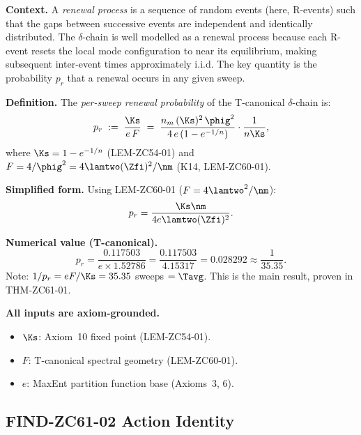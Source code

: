 \documentclass[12pt, a4paper]{article}
\begin{document}
\begin{formalbox}[title={DEF-ZC61-01: Renewal Probability
  $p_r = \Ks/(eF)$ ($R_0$)}]

\textbf{Context.}
A \emph{renewal process} is a sequence of random events
(here, R-events) such that the gaps between successive events
are independent and identically distributed.
The $\delta$-chain is well modelled as a renewal process
because each R-event resets the local mode configuration
to near its equilibrium, making subsequent inter-event
times approximately i.i.d.
The key quantity is the probability $p_r$ that a renewal
occurs in any given sweep.

\medskip
\textbf{Definition.}
The \emph{per-sweep renewal probability} of the T-canonical
$\delta$-chain is:
\begin{equation}
  p_r \;:=\; \frac{\Ks}{e\,F}
  \;=\; \frac{n_m\,(\Ks)^2\,\phig^2}{4\,e\,(1-e^{-1/n})}
  \cdot \frac{1}{n\Ks},
  \label{eq:pr}
\end{equation}
where $\Ks = 1-e^{-1/n}$ (LEM-ZC54-01) and
$F = 4/\phig^2 = 4\lamtwo(\Zfi)^2/\nm$ (K14, LEM-ZC60-01).

\textbf{Simplified form.}
Using LEM-ZC60-01 ($F = 4\lamtwo^2/\nm$):
\[
  p_r = \frac{\Ks\nm}{4e\lamtwo(\Zfi)^2}.
\]

\textbf{Numerical value (T-canonical).}
\[
  p_r = \frac{0.117503}{e \times 1.52786}
      = \frac{0.117503}{4.15317}
      = 0.028292 \approx \frac{1}{35.35}.
\]
Note: $1/p_r = eF/\Ks = 35.35$ sweeps $= \Tavg$.
This is the main result, proven in THM-ZC61-01.

\textbf{All inputs are axiom-grounded.}
\begin{itemize}[leftmargin=2em, noitemsep]
  \item $\Ks$: Axiom~10 fixed point (LEM-ZC54-01).
  \item $F$: T-canonical spectral geometry (LEM-ZC60-01).
  \item $e$: MaxEnt partition function base (Axioms~3, 6).
\end{itemize}
\end{formalbox}

\subsection{FIND-ZC61-02 \quad Action Identity}
\label{sec:find02}

\end{document}
